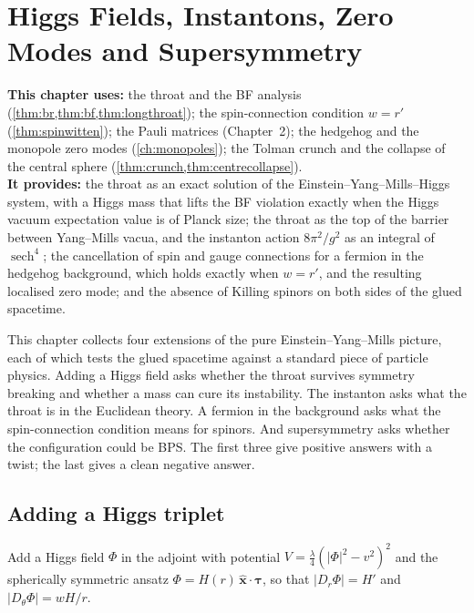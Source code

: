 \chapter{Higgs Fields, Instantons, Zero Modes and Supersymmetry}
\label{ch:higgs}

\begin{usesbox}
\textbf{This chapter uses:} the throat and the BF analysis (\cref{thm:br,thm:bf,thm:longthroat}); the spin-connection condition $w=r'$ (\cref{thm:spinwitten}); the Pauli matrices (Chapter~2); the hedgehog and the monopole zero modes (\cref{ch:monopoles}); the Tolman crunch and the collapse of the central sphere (\cref{thm:crunch,thm:centrecollapse}).\\
\textbf{It provides:} the throat as an exact solution of the Einstein--Yang--Mills--Higgs system, with a Higgs mass that lifts the BF violation exactly when the Higgs vacuum expectation value is of Planck size; the throat as the top of the barrier between Yang--Mills vacua, and the instanton action $8\pi^2/g^2$ as an integral of $\operatorname{sech}^4$; the cancellation of spin and gauge connections for a fermion in the hedgehog background, which holds exactly when $w=r'$, and the resulting localised zero mode; and the absence of Killing spinors on both sides of the glued spacetime.
\end{usesbox}

This chapter collects four extensions of the pure Einstein--Yang--Mills picture, each of which tests the glued spacetime against a standard piece of particle physics. Adding a Higgs field asks whether the throat survives symmetry breaking and whether a mass can cure its instability. The instanton asks what the throat is in the Euclidean theory. A fermion in the background asks what the spin-connection condition means for spinors. And supersymmetry asks whether the configuration could be BPS. The first three give positive answers with a twist; the last gives a clean negative answer.

\section{Adding a Higgs triplet}

Add a Higgs field $\Phi$ in the adjoint with potential $V=\frac\lambda4(|\Phi|^2-v^2)^2$ and the spherically symmetric ansatz $\Phi=H(r)\,\hat{\mathbf x}\cdot\boldsymbol\tau$, so that $|D_r\Phi|=H'$ and $|D_\theta\Phi|=wH/r$.

